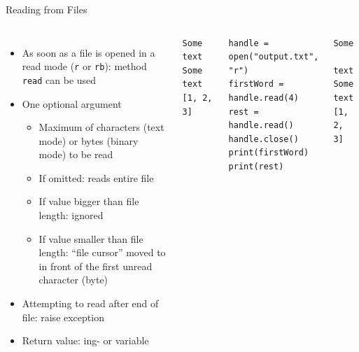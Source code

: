 \begin{frame}[fragile]{Reading from Files}
%
\begin{columns}[T]
\vspace{-8pt}
\begin{itemize}
\item As soon as a file is opened in a read mode (\texttt{r} or \texttt{rb}): method \texttt{read} can be used
\item One optional argument
	\begin{itemize}
	\item Maximum of characters (text mode) or bytes (binary mode) to be read
	\item If omitted: reads entire file
	\item If value bigger than file length: ignored
	\item If value smaller than file length: \enquote{file cursor} moved to in front of the first unread character (byte)
	\end{itemize}
\item Attempting to read after end of file: raise exception
\item Return value: ing- or  variable
\end{itemize}
%
\vspace{-40pt}
\begin{cmdbox}
\begin{verbatim}
Some text Some text
[1, 2, 3]
\end{verbatim}
\end{cmdbox}
%
\begin{codebox}
\begin{verbatim}
handle = open("output.txt", "r")
firstWord = handle.read(4)
rest = handle.read()
handle.close()
print(firstWord)
print(rest)
\end{verbatim}
\end{codebox}
%
\begin{cmdbox}
\begin{verbatim}
Some
 text Some text
[1, 2, 3]
\end{verbatim}
\end{cmdbox}
%
\end{columns}
%
\end{frame}


